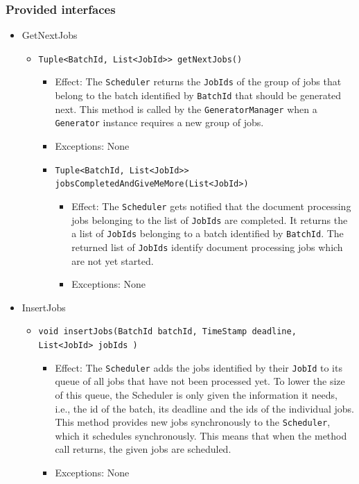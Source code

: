 \documentclass[a4paper,10pt]{article}
\begin{document}
\subsubsection*{Provided interfaces}
\begin{itemize}
    \item GetNextJobs
    \begin{itemize}
        \item \texttt{Tuple<BatchId, List<JobId>> getNextJobs()}
        \begin{itemize}
            \item Effect: The \texttt{Scheduler} returns the \texttt{JobIds} of the group of jobs that belong to the batch identified by \texttt{BatchId} that should be generated next. This method is called by the \texttt{GeneratorManager} when a \texttt{Generator} instance requires a new group of jobs.
            \item Exceptions: None


            \item \texttt{Tuple<BatchId, List<JobId>>  jobsCompletedAndGiveMeMore(List<JobId>)}
            \begin{itemize}
                \item Effect: The \texttt{Scheduler} gets notified that the document processing jobs belonging to the list of \texttt{JobIds} are completed. It returns the a list of \texttt{JobIds} belonging to a batch identified by \texttt{BatchId}. The returned list of \texttt{JobIds} identify document processing jobs which are not yet started.
                \item Exceptions: None
            \end{itemize}
        \end{itemize}
    \end{itemize}

    \item InsertJobs
    \begin{itemize}
        \item \texttt{void insertJobs(BatchId batchId, TimeStamp deadline, List<JobId> jobIds )}
        \begin{itemize}
            \item Effect: The \texttt{Scheduler} adds the jobs identified by their \texttt{JobId} to its queue of all jobs that have not been processed yet. To lower the size of this queue, the Scheduler is only given the information it needs, i.e., the id of the batch, its deadline and the ids of the individual jobs. This method provides new jobs synchronously to the \texttt{Scheduler}, which it schedules synchronously. This means that when the method call returns, the given jobs are scheduled.
            \item Exceptions: None
        \end{itemize}
    \end{itemize}
    

\end{itemize}
\end{document}
